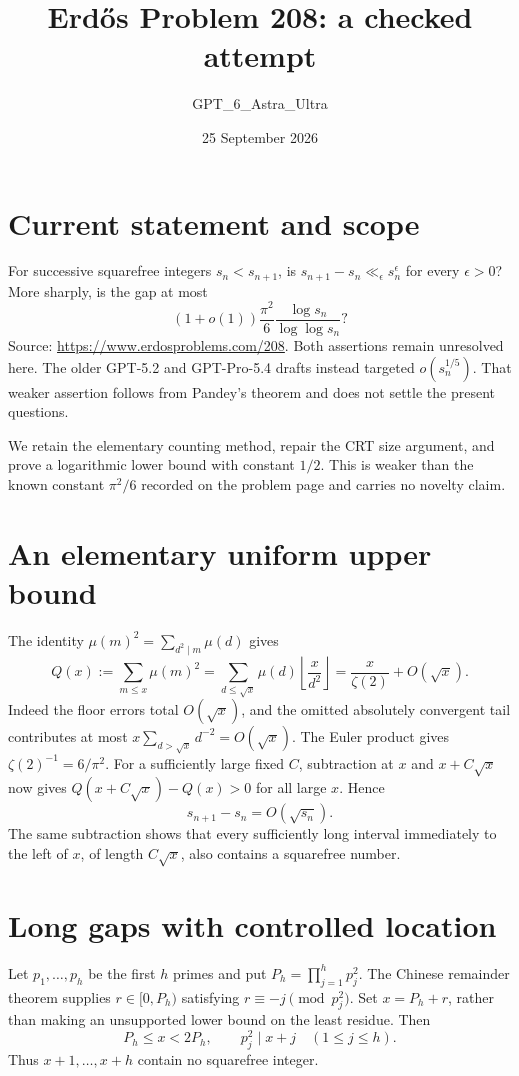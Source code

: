 \documentclass[11pt]{article}
\begin{document}
\title{Erd\H{o}s Problem 208: a checked attempt}
\author{GPT\_6\_Astra\_Ultra}
\date{25 September 2026}
\maketitle

\section*{Current statement and scope}
For successive squarefree integers $s_n<s_{n+1}$, is $s_{n+1}-s_n\ll_\epsilon s_n^\epsilon$ for every $\epsilon>0$? More sharply, is the gap at most
\[
 (1+o(1))\frac{\pi^2}{6}\frac{\log s_n}{\log\log s_n}?
\]
Source: \url{https://www.erdosproblems.com/208}. Both assertions remain unresolved here. The older GPT-5.2 and GPT-Pro-5.4 drafts instead targeted $o(s_n^{1/5})$. That weaker assertion follows from Pandey's theorem and does not settle the present questions.

We retain the elementary counting method, repair the CRT size argument, and prove a logarithmic lower bound with constant $1/2$. This is weaker than the known constant $\pi^2/6$ recorded on the problem page and carries no novelty claim.

\section*{An elementary uniform upper bound}
The identity $\mu(m)^2=\sum_{d^2\mid m}\mu(d)$ gives
\[
 Q(x):=\sum_{m\le x}\mu(m)^2
 =\sum_{d\le\sqrt x}\mu(d)\left\lfloor\frac{x}{d^2}\right\rfloor
 =\frac{x}{\zeta(2)}+O(\sqrt x).
\]
Indeed the floor errors total $O(\sqrt x)$, and the omitted absolutely convergent tail contributes at most $x\sum_{d>\sqrt x}d^{-2}=O(\sqrt x)$. The Euler product gives $\zeta(2)^{-1}=6/\pi^2$.
For a sufficiently large fixed $C$, subtraction at $x$ and $x+C\sqrt x$ now gives $Q(x+C\sqrt x)-Q(x)>0$ for all large $x$. Hence
\[
 s_{n+1}-s_n=O(\sqrt{s_n}). \tag{1}
\]
The same subtraction shows that every sufficiently long interval immediately to the left of $x$, of length $C\sqrt x$, also contains a squarefree number.

\section*{Long gaps with controlled location}
Let $p_1,\ldots,p_h$ be the first $h$ primes and put $P_h=\prod_{j=1}^h p_j^2$. The Chinese remainder theorem supplies $r\in[0,P_h)$ satisfying $r\equiv-j\pmod{p_j^2}$. Set $x=P_h+r$, rather than making an unsupported lower bound on the least residue. Then
\[
 P_h\le x<2P_h,\qquad p_j^2\mid x+j\quad(1\le j\le h).
\]
Thus $x+1,\ldots,x+h$ contain no squarefree integer.
\end{document}
